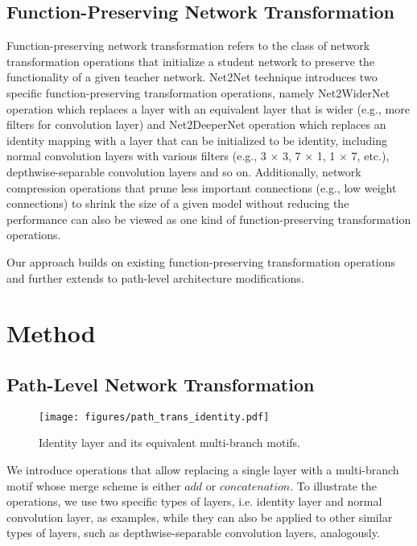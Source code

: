 \documentclass{article}
\begin{document}
\subsection{Function-Preserving Network Transformation}\label{para:net-trans}
Function-preserving network transformation refers to the class of network transformation operations that initialize a student network to preserve the functionality of a given teacher network. Net2Net technique \cite{chen2015net2net} introduces two specific function-preserving transformation operations, namely Net2WiderNet operation which replaces a layer with an equivalent layer that is wider (e.g., more filters for convolution layer) and Net2DeeperNet operation which replaces an identity mapping with a layer that can be initialized to be identity, including normal convolution layers with various filters (e.g., 3 $\times$ 3, 7 $\times$ 1, 1 $\times$ 7, etc.), depthwise-separable convolution layers \cite{chollet2016xception} and so on. Additionally, network compression operations \cite{han2015learning} that prune less important connections (e.g., low weight connections) to shrink the size of a given model without reducing the performance can also be viewed as one kind of function-preserving transformation operations. 

Our approach builds on existing function-preserving transformation operations and further extends to path-level architecture modifications. 

\section{Method}
\subsection{Path-Level Network Transformation}\label{sec:path_trans}
\begin{figure}[t]
	\centering
	\texttt{[image: figures/path\_trans\_identity.pdf]}
	\caption{Identity layer and its equivalent multi-branch motifs.}
	\label{fig:path_trans_identity}
\end{figure}

We introduce operations that allow replacing a single layer with a multi-branch motif whose merge scheme is either $add$ or $concatenation$. To illustrate the operations, we use two specific types of layers, i.e. identity layer and normal convolution layer, as examples, while they can also be applied to other similar types of layers, such as depthwise-separable convolution layers, analogously. 
\end{document}
